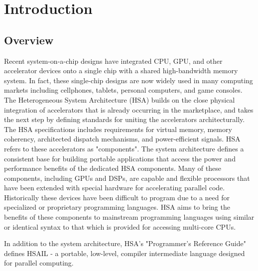 \documentclass[draft]{book}
\begin{document}
\chapter{Introduction} \label{index}\hypertarget{index}{}
\hypertarget{overview}{}\section{Overview}\label{overview}

Recent system-on-a-chip designs have integrated CPU, GPU, and other accelerator
devices onto a single chip with a shared high-bandwidth memory system. In fact,
these single-chip designs are now widely used in many computing markets
including cellphones, tablets, personal computers, and game consoles. The
Heterogeneous System Architecture (HSA) builds on the close physical integration
of accelerators that is already occurring in the marketplace, and takes the next
step by defining standards for uniting the accelerators architecturally. The
HSA specifications includes requirements for virtual memory, memory coherency,
architected dispatch mechanisms, and power-efficient signals. HSA refers to
these accelerators as "components". The system architecture defines a
consistent base for building portable applications that access the power and
performance benefits of the dedicated HSA components. Many of these components,
including GPUs and DSPs, are capable and flexible processors that have been
extended with special hardware for accelerating parallel code. Historically
these devices have been difficult to program due to a need for specialized or
proprietary programming languages. HSA aims to bring the benefits of these
components to mainstream programming languages using similar or identical syntax
to that which is provided for accessing multi-core CPUs.

In addition to the system architecture, HSA's "Programmer's Reference Guide"
defines HSAIL - a portable, low-level, compiler intermediate language designed
for parallel computing.
\end{document}
